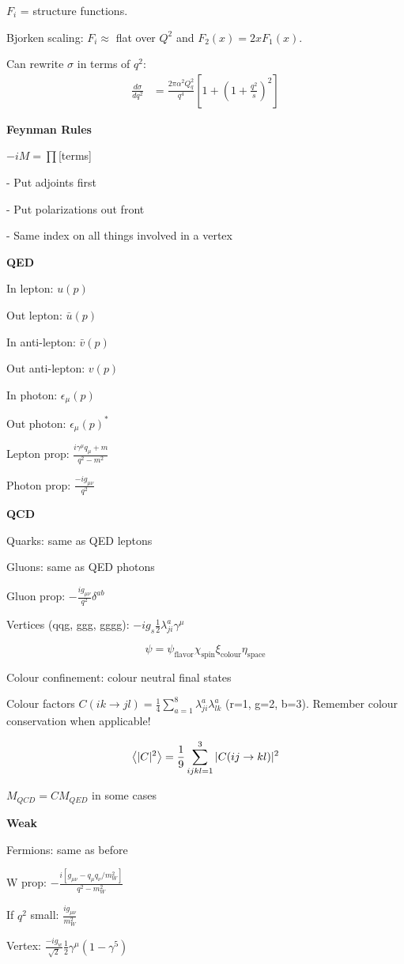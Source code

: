 \documentclass[10pt,letterpaper]{article}
\newcommand{\0}{\mathcal{O}}
\begin{document}
\begin{multicols}{3}
$F_i$ = structure functions.

Bjorken scaling: $F_i \approx$ flat over $Q^2$ and $F_2(x)=2xF_1(x)$.

Can rewrite $\sigma$ in terms of $q^2$:
\begin{align*}
    \frac{d\sigma}{dq^2} &= \frac{2\pi\alpha^2 Q_q^2}{q^4}\left[1 + \left(1 + \frac{q^2}{s}\right)^2\right]
\end{align*}

\textbf{Feynman Rules}

$-iM = \prod$[terms]

- Put adjoints first

- Put polarizations out front

- Same index on all things involved in a vertex

\textbf{QED}

In lepton: $u(p)$

Out lepton: $\bar{u}(p)$

In anti-lepton: $\bar{v}(p)$

Out anti-lepton: $v(p)$

In photon: $\epsilon_\mu(p)$ 

Out photon: $\epsilon_\mu(p)^*$ 

Lepton prop: $\frac{i\gamma^\mu q_\mu + m}{q^2 - m^2}$

Photon prop: $\frac{-ig_{\mu\nu}}{q^2}$

\textbf{QCD}

Quarks: same as QED leptons

Gluons: same as QED photons

Gluon prop: $-\frac{ig_{\mu\nu}}{q^2}\delta^{ab}$

Vertices (qqg, ggg, gggg): $-ig_s \frac{1}{2}\lambda^a_{ji}\gamma^\mu$

$$\psi = \psi_{\text{flavor}}\chi_{\text{spin}}\xi_{\text{colour}}\eta_{\text{space}}$$

Colour confinement: colour neutral final states

Colour factors $C(ik \to jl) = \frac{1}{4}\sum_{a=1}^8 \lambda^{a}_{ji}\lambda^a_{lk}$ (r=1, g=2, b=3). Remember colour conservation when applicable!

\begin{align*}
    \expval{|C|^2} &= \frac{1}{9}\sum_{ijkl=1}^3 |C(ij\to kl)|^2 \\
\end{align*}

$M_{QCD} = C M_{QED}$ in some cases

\textbf{Weak}

Fermions: same as before

W prop: $-\frac{i[g_{\mu\nu} - q_\mu q_\nu / m_W^2]}{q^2 - m_W^2}$

If $q^2$ small: $\frac{ig_{\mu\nu}}{m_W^2}$

Vertex: $\frac{-ig_w}{\sqrt{2}}\frac{1}{2}\gamma^\mu (1 - \gamma^5)$


\end{multicols}
\end{document}
